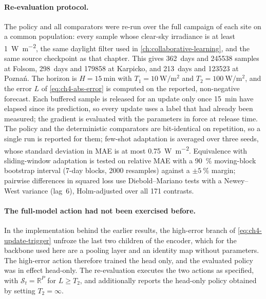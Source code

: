 
\paragraph{Re-evaluation protocol.} The policy and all comparators were re-run over the full
campaign of each site on a common population: every sample whose clear-sky irradiance is at
least \SI{1}{\watt\per\square\meter}, the same daylight filter used in
\cref{ch:collaborative-learning}, and the same source checkpoint as that chapter. This gives
362~days and \num{245538} samples at Folsom, 298~days and \num{179858} at Karpicko, and 213~days
and \num{123523} at Poznań. The horizon is $H=\SI{15}{\minute}$ with
$T_1=\SI{10}{\watt\per\square\meter}$ and $T_2=\SI{100}{\watt\per\square\meter}$, and the error
$L$ of \cref{eq:ch4-abs-error} is computed on the reported, non-negative forecast. Each buffered
sample is released for an update only once \SI{15}{\minute} have elapsed since its prediction, so
every update uses a label that had already been measured; the gradient is evaluated with the
parameters in force at release time. The policy and the deterministic comparators are
bit-identical on repetition, so a single run is reported for them; few-shot adaptation is averaged
over three seeds, whose standard deviation in MAE is at most \SI{0.75}{\watt\per\square\meter}. Equivalence
with sliding-window adaptation is tested on relative MAE with a \SI{90}{\percent} moving-block
bootstrap interval (\num{7}-day blocks, \num{2000} resamples) against a $\pm\SI{5}{\percent}$
margin; pairwise differences in squared loss use Diebold--Mariano tests with a Newey--West
variance (lag~6), Holm-adjusted over all 171 contrasts.

\paragraph{The full-model action had not been exercised before.} In the implementation behind
the earlier results, the high-error branch of \cref{eq:ch4-update-trigger} unfroze the last two
children of the encoder, which for the backbone used here are a pooling layer and an identity map
without parameters. The high-error action therefore trained the head only, and the evaluated policy
was in effect head-only. The re-evaluation executes the two actions as specified, with
$\mathcal{S}_t=\mathbb{R}^{P}$ for $L\ge T_2$, and additionally reports the head-only policy
obtained by setting $T_2=\infty$.

